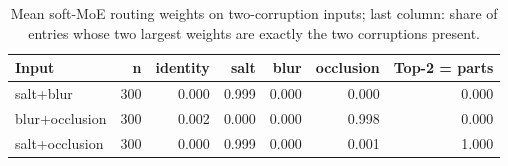 \begin{table}[t]
\centering
\caption{Mean soft-MoE routing weights on two-corruption inputs; last column: share of entries whose two largest weights are exactly the two corruptions present.}
\label{tab:task3_mixed_routing}
\begin{tabular}{lrrrrrr}
\toprule
Input & n & identity & salt & blur & occlusion & Top-2 = parts \\
\midrule
salt+blur & 300 & 0.000 & 0.999 & 0.000 & 0.000 & 0.000 \\
blur+occlusion & 300 & 0.002 & 0.000 & 0.000 & 0.998 & 0.000 \\
salt+occlusion & 300 & 0.000 & 0.999 & 0.000 & 0.001 & 1.000 \\
\bottomrule
\end{tabular}
\end{table}
